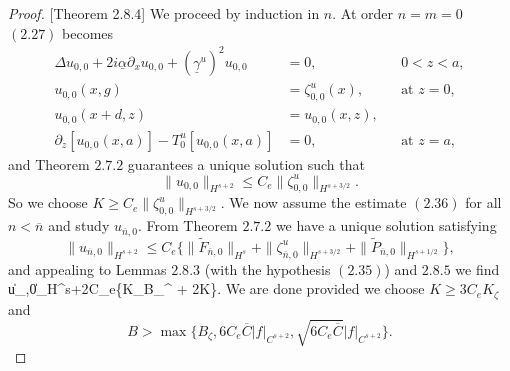 \begin{proof}{[Theorem 2.8.4]} We proceed by induction in $n$. At order $n=m=0$ $(2.27)$ becomes
\begin{subequations}
\begin{align}
\Delta u_{0,0} +2i\underline{\alpha}\partial_{x}u_{0,0}+(\underline{\gamma}^u)^2u_{0,0}&=0,&& \text{$0<z<a$}, \\
u_{0,0}(x,g)&=\zeta_{0,0}^u(x),&&\text{at $z=0$},\\
u_{0,0}(x+d,z)&=u_{0,0}(x,z), \\
\partial_z \left[u_{0,0}(x,a)\right] - T_0^u[u_{0,0}(x,a)]&=0,&& \text{at $z=a$}, 
\end{align}
\end{subequations}
and Theorem $2.7.2$ guarantees a unique solution such that 
$$\|u_{0,0}\|_{H^{s+2}}\le C_e\|\zeta_{0,0}^u\|_{H^{s+3/2}}.   $$
So we choose $K \ge C_e\|\zeta_{0,0}^u\|_{H^{s+3/2}} $. We now assume the estimate $(2.36)$ for all $n < \overline{n}$ and study $u_{\overline{n},0}$. From Theorem $2.7.2$ we have a unique solution satisfying 
$$\|u_{\overline{n},0}\|_{H^{s+2}}\le C_e\{\|\tilde{F}_{\overline{n},0}\|_{H^{s}}+\|\zeta_{\overline{n},0}^u\|_{H^{s+3/2}}+\|\tilde{P}_{\overline{n},0}\|_{H^{s+1/2}}  \}, $$
and appealing to Lemmas $2.8.3$ (with the hypothesis $(2.35)$) and $2.8.5$ we find
\bes
\|u_{,0}\|_{H^{s+2}}\le C_e\left\{K_{\zeta}B_{\zeta}^{} + 2K  \right\}.
\ees
We are done provided we choose $K \ge 3C_eK_{\zeta}$ and
$$ B > \max\Big\{B_{\zeta},6C_e\overline{C}|f|_{C^{s+2}},\sqrt{6C_e\overline{C}}|f|_{C^{s+2}} \Big\}.$$
\end{proof}